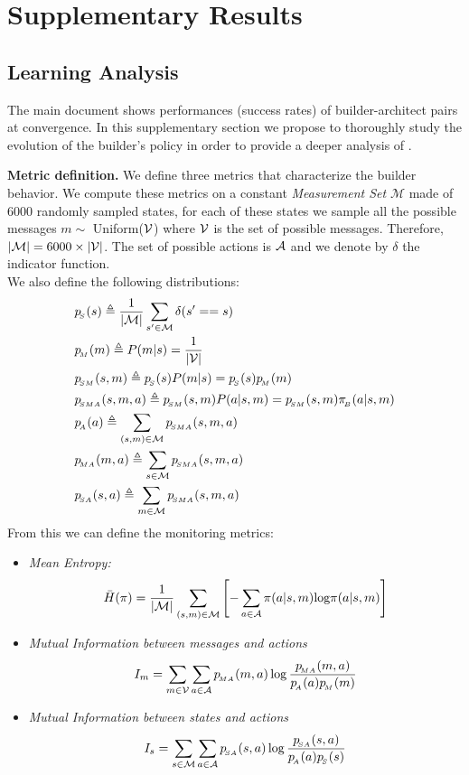 \newpage \section{Supplementary Results}
%
\label{ap:sup_res}
\subsection{Learning Analysis}
\label{ap:results_bw}
The main document shows performances (success rates) of builder-architect pairs at convergence. In this supplementary section we propose to thoroughly study the evolution of the builder's policy in order to provide a deeper analysis of \abig.

\textbf{Metric definition. } We define three metrics that characterize the builder behavior. We compute these metrics on a constant \emph{Measurement Set} $\mathcal{M}$ made of 6000 randomly sampled states, for each of these states we sample all the possible messages $m\sim$ Uniform(${\mathcal{V}}$) where ${\mathcal{V}}$ is the set of possible messages. Therefore, $|{\mathcal{M}}| = 6000\times|{\mathcal{V}}|$. The set of possible actions is ${\mathcal{A}}$ and we denote by $\delta$ the indicator function.\\

We also define the following distributions:
 \begin{align*}
     &\ps(s) \triangleq \frac{1}{|\gM|}\sum_{s'\in\gM}\delta(s'==s)\\
     &\pM(m) \triangleq P(m|s) =  \frac{1}{|\gV|}\\
     &\psm(s,m) \triangleq \ps(s)P(m|s) = \ps(s)\pM(m)\\
     &\psma(s,m,a) \triangleq \psm(s,m)P(a|s,m) = \psm(s,m)\pib(a|s,m)\\
    & \pa(a) \triangleq \sum_{(s,m)\in \gM} \psma(s,m,a)\\
     &\pma(m,a)\triangleq \sum_{s\in\gM}\psma(s,m,a)\\
     &\psa(s,a)  \triangleq \sum_{m\in\gM}\psma(s,m,a)
 \end{align*}
From this we can define the monitoring metrics:
\begin{itemize}
    \item \textit{Mean Entropy: }
    $$\bar{H}(\pi)=\frac{1}{|{\mathcal{M}}|}\sum_{(s,m)\in \mathcal{M}} \left[ - \sum_{a\in {\mathcal{A}}}\pi(a|s,m)\text{log}\pi(a|s,m)\right]$$ 
    \item \textit{Mutual Information between messages and actions}
    $$I_m = \sum_{m\in {\mathcal{V}}}\sum_{a\in {\mathcal{A}}}p_{\!_{MA}}(m,a)\log\frac{p_{\!_{MA}}(m,a)}{p_{\!_A}(a)p_{\!_M}(m)}$$
    \item \textit{Mutual Information between states and actions}
    $$I_s = \sum_{s\in {\mathcal{M}}}\sum_{a\in {\mathcal{A}}}p_{\!_{SA}}(s,a)\log\frac{p_{\!_{SA}}(s,a)}{p_{\!_A}(a)p_{\!_S}(s)} $$
\end{itemize}

